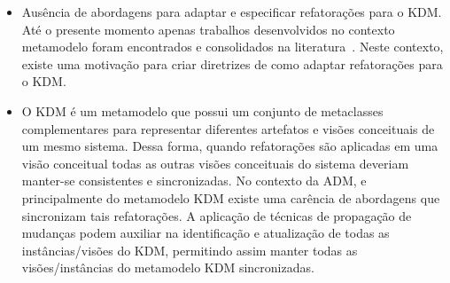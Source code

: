 \begin{itemize}

    
    \item Ausência de abordagens para adaptar e especificar refatorações para o KDM. Até o presente momento apenas trabalhos desenvolvidos no contexto metamodelo  foram encontrados e consolidados na literatura~\cite{revisao_sistematica_uml_refactoring, durelli_systematic_mapping}. Neste contexto, existe uma motivação para criar diretrizes de como adaptar refatorações para o KDM.
    

	\item O KDM é um metamodelo que possui um conjunto de metaclasses complementares para representar diferentes artefatos e visões conceituais de um mesmo sistema. Dessa forma, quando refatorações são aplicadas em uma visão conceitual todas as outras visões conceituais do sistema deveriam manter-se consistentes e sincronizadas. No contexto da ADM, e principalmente do metamodelo KDM existe uma carência de abordagens que sincronizam tais refatorações. A aplicação de técnicas de propagação de mudanças podem auxiliar na identificação e atualização de todas as instâncias/visões do KDM, permitindo assim manter todas as visões/instâncias do metamodelo KDM sincronizadas.  


\end{itemize}
